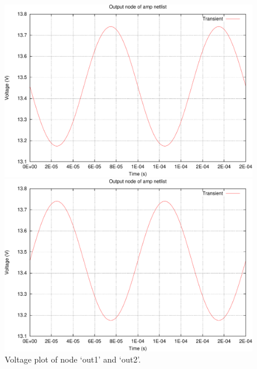 \documentclass[12pt]{article}
\begin{document}
\begin{figure}[!htbp]
  \centering
    \includegraphics[width=.8\textwidth]{amp_tran1_out1_t-crop.pdf}

    \vspace{2em}

    \includegraphics[width=.8\textwidth]{amp_tran1_out2_t-crop.pdf}
  \caption{Voltage plot of node `out1' and `out2'.}
  \label{fig:tran}
\end{figure}
\end{document}
